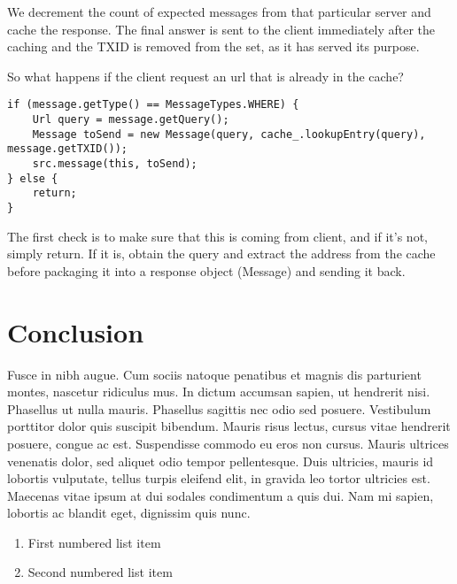 \documentclass[a4paper, 12pt]{article} %
\begin{document}
We decrement the count of expected messages from that particular server and cache the response. The final answer is sent to the client immediately after the caching and the TXID is removed from the set, as it has served its purpose.

So what happens if the client request an url that is already in the cache?

\begin{lstlisting}
if (message.getType() == MessageTypes.WHERE) {
    Url query = message.getQuery();
    Message toSend = new Message(query, cache_.lookupEntry(query), message.getTXID());
    src.message(this, toSend);
} else {
    return;
}
\end{lstlisting}

The first check is to make sure that this is coming from  client, and if it’s not, simply return. If it is, obtain the query and extract the address from the cache before packaging it into a response object (Message) and sending it back.


\section*{Conclusion}

Fusce in nibh augue. Cum sociis natoque penatibus et magnis dis parturient montes, nascetur ridiculus mus. In dictum accumsan sapien, ut hendrerit nisi. Phasellus ut nulla mauris. Phasellus sagittis nec odio sed posuere. Vestibulum porttitor dolor quis suscipit bibendum. Mauris risus lectus, cursus vitae hendrerit posuere, congue ac est. Suspendisse commodo eu eros non cursus. Mauris ultrices venenatis dolor, sed aliquet odio tempor pellentesque. Duis ultricies, mauris id lobortis vulputate, tellus turpis eleifend elit, in gravida leo tortor ultricies est. Maecenas vitae ipsum at dui sodales condimentum a quis dui. Nam mi sapien, lobortis ac blandit eget, dignissim quis nunc.

\begin{enumerate}
\item First numbered list item
\item Second numbered list item
\end{enumerate}



%
%
%
%

\end{document}
